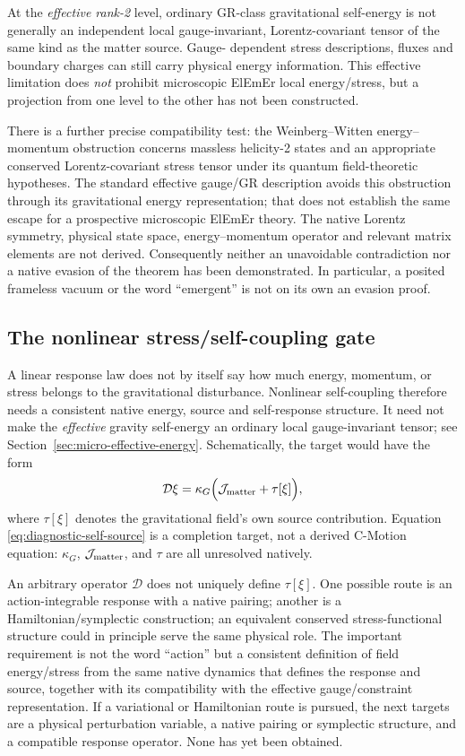 \documentclass[11pt]{article}
\newcommand{\cmotion}{\mbox{C-Motion}}
\theoremstyle{plain}
\theoremstyle{remark}
\begin{document}
At the \emph{effective rank-2} level, ordinary GR-class gravitational
self-energy is not generally an independent local gauge-invariant,
Lorentz-covariant tensor of the same kind as the matter source.  Gauge-
dependent stress descriptions, fluxes and boundary charges can still carry
physical energy information.  This effective limitation does \emph{not}
prohibit microscopic ElEmEr local energy/stress, but a projection from one
level to the other has not been constructed.

There is a further precise compatibility test: the Weinberg--Witten
energy--momentum obstruction \cite{WeinbergWitten1980} concerns massless
helicity-2 states and an
appropriate conserved Lorentz-covariant stress tensor under its quantum
field-theoretic hypotheses.  The standard effective gauge/GR description
avoids this obstruction through its gravitational energy representation;
that does not establish the same escape for a prospective microscopic
ElEmEr theory.  The native Lorentz symmetry, physical state space,
energy--momentum operator and relevant matrix elements are not derived.
Consequently neither an unavoidable contradiction nor a native evasion of
the theorem has been demonstrated.  In particular, a posited frameless
vacuum or the word ``emergent'' is not on its own an evasion proof.

\subsection{The nonlinear stress/self-coupling gate}

A linear response law does not by itself say how much energy, momentum, or stress belongs to
the gravitational disturbance.  Nonlinear self-coupling therefore needs a consistent native energy,
source and self-response structure.  It need not make the \emph{effective}
gravity self-energy an ordinary local gauge-invariant tensor; see
Section~\ref{sec:micro-effective-energy}.  Schematically, the target would have the form
\begin{equation}
\mathcal D\xi
=\kappa_G\Big(\mathcal J_{\rm matter}+\tau[\xi]\Big),
\label{eq:diagnostic-self-source}
\end{equation}
where $\tau[\xi]$ denotes the gravitational field's own source contribution.  Equation
\eqref{eq:diagnostic-self-source} is a completion target, not a derived \cmotion{} equation:
$\kappa_G$, $\mathcal J_{\rm matter}$, and $\tau$ are all unresolved natively.

An arbitrary operator $\mathcal D$ does not uniquely define $\tau[\xi]$.  One possible route
is an action-integrable response with a native pairing; another is a Hamiltonian/symplectic
construction; an equivalent conserved stress-functional structure could in principle serve
the same physical role.  The important requirement is not the word ``action'' but a
consistent definition of field energy/stress from the same native dynamics that defines the
response and source, together with its compatibility with the effective
gauge/constraint representation.  If a variational or Hamiltonian route is pursued, the next targets are a
physical perturbation variable, a native pairing or symplectic structure, and a compatible
response operator.  None has yet been obtained.
\end{document}
